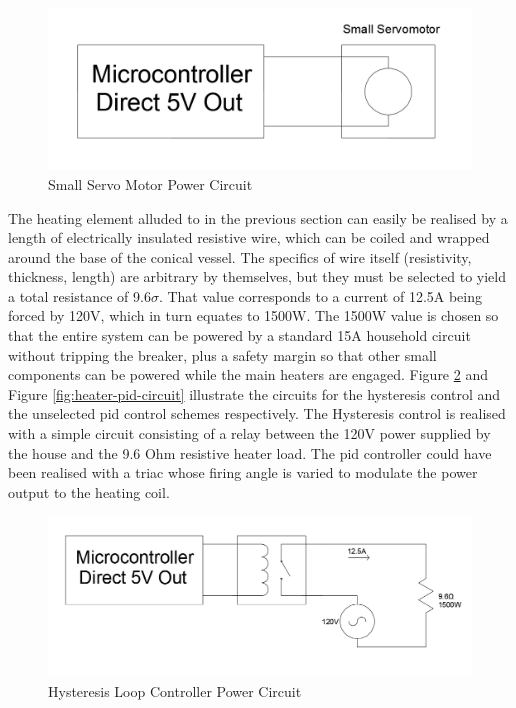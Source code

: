 \documentclass{article}
\begin{document}
\begin{figure}[H]
\begin{center}
\includegraphics[scale=0.20]{servo-small-actuator-circuit.png}
\caption{Small Servo Motor Power Circuit}
\label{fig:servo-small-actuator-circuit}
\end{center}
\end{figure}

The heating element alluded to in the previous section can easily be realised by a length of electrically insulated resistive wire, which can be coiled and wrapped around the base of the conical vessel. The specifics of wire itself (resistivity, thickness, length) are arbitrary by themselves, but they must be selected to yield a total resistance of 9.6$\sigma$. That value corresponds to a current of 12.5A being forced by 120V, which in turn equates to 1500W. The 1500W value is chosen so that the entire system can be powered by a standard 15A household circuit without tripping the breaker, plus a safety margin so that other small components can be powered while the main heaters are engaged. Figure \ref{fig:heater-hysteresis-circuit} and Figure \ref{fig:heater-pid-circuit} illustrate the circuits for the hysteresis control and the unselected \gls{pid} control schemes respectively. The Hysteresis control is realised with a simple circuit consisting of a relay between the 120V power supplied by the house and the 9.6 Ohm resistive heater load. The \gls{pid} controller could have been realised with a triac whose firing angle is varied to modulate the power output to the heating coil.

\begin{figure}[H]
\begin{center}
\includegraphics[scale=0.20]{heater-hysteresis-circuit.png}
\caption{Hysteresis Loop Controller Power Circuit}
\label{fig:heater-hysteresis-circuit}
\end{center}
\end{figure}
\end{document}

